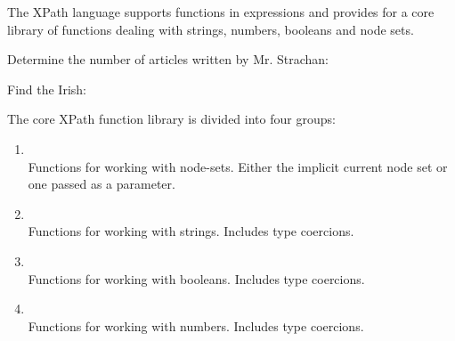 \documentclass[20pt,landscape,headrule,footrule]{foils}
\begin{document}


The XPath language supports functions in expressions and provides for
a core library of functions dealing with strings, numbers, booleans
and node sets.

Determine the number of articles written by Mr. Strachan:


Find the Irish:




The core XPath function library is divided into four groups:

\begin{enumerate}
  \item {}\\
    Functions for working with node-sets.
    Either the implicit current node set or one passed as a parameter.
  \item {}\\
    Functions for working with strings.  Includes type coercions.
  \item {}\\
    Functions for working with booleans.  Includes type coercions.
  \item {}\\
    Functions for working with numbers.  Includes type coercions.
\end{enumerate}

\end{document}
